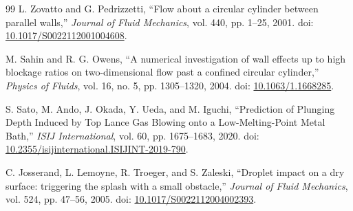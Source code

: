 \documentclass[11pt,a4paper]{article}
\begin{document}
\begin{thebibliography}{99}
L. Zovatto and G. Pedrizzetti,
``Flow about a circular cylinder between parallel walls,''
\emph{Journal of Fluid Mechanics}, vol. 440, pp. 1--25, 2001.
doi: \href{https://doi.org/10.1017/S0022112001004608}{10.1017/S0022112001004608}.

M. Sahin and R. G. Owens,
``A numerical investigation of wall effects up to high blockage ratios on two-dimensional flow past a confined circular cylinder,''
\emph{Physics of Fluids}, vol. 16, no. 5, pp. 1305--1320, 2004.
doi: \href{https://doi.org/10.1063/1.1668285}{10.1063/1.1668285}.


S. Sato, M. Ando, J. Okada, Y. Ueda, and M. Iguchi,
``Prediction of Plunging Depth Induced by Top Lance Gas Blowing onto a Low-Melting-Point Metal Bath,''
\emph{ISIJ International}, vol. 60, pp. 1675--1683, 2020.
doi: \href{https://doi.org/10.2355/isijinternational.ISIJINT-2019-790}{10.2355/isijinternational.ISIJINT-2019-790}.

C. Josserand, L. Lemoyne, R. Troeger, and S. Zaleski,
``Droplet impact on a dry surface: triggering the splash with a small obstacle,''
\emph{Journal of Fluid Mechanics}, vol. 524, pp. 47--56, 2005.
doi: \href{https://doi.org/10.1017/S0022112004002393}{10.1017/S0022112004002393}.

\end{thebibliography}
\end{document}
